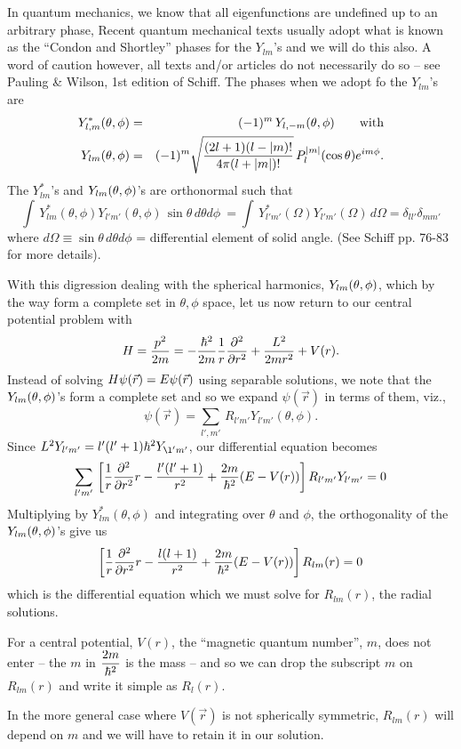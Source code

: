 In quantum mechanics, we know that all eigenfunctions are undefined up to an arbitrary phase, Recent quantum mechanical texts usually adopt what is known as the ``Condon and Shortley'' phases for the $Y_{lm}$'s and we will 
do this also. A word of caution however, all texts and/or articles do not necessarily do so -- see Pauling \& Wilson, 1st edition of Schiff. The phases when we adopt fo the $Y_{lm}$'s are
\begin{eqnarray*}
Y^*_{l,m}(\theta,\phi) &=& (-1)^m\, Y_{l,-m}(\theta,\phi) \mbox{ ~~~~ with} \\
Y_{lm}(\theta,\phi) &=& (-1)^m \sqrt{(2l+1)(l-|m)! \over 4\pi(l+|m|)!}  \, P_l^{|m|}(\cos\theta)e^{im\phi}.
\end{eqnarray*}
The $Y^*_{lm}$'s and $Y_{lm}(\theta,\phi)$'s are orthonormal such that 
\[ \int\, Y^*_{lm}(\theta,\phi) Y_{l'm'}(\theta,\phi)\, \sin\theta\, d\theta d\phi  \ = \int \, Y^*_{l'm'}(\Omega)Y_{l'm'}(\Omega)\, d\Omega = \delta_{ll'} \delta_{mm'} \]
where $d\Omega \equiv \sin\theta \, d\theta d\phi $ = differential element of solid angle. (See Schiff pp. 76-83 for more details).

With this digression dealing with the spherical harmonics, $Y_{lm}(\theta,\phi)$, which by the way form a complete set in $\theta, \phi$ space, let us now return to our central potential problem with 
\[ H = {p^2\over2m} = -{\hbar^2\over2m} {1\over r} {\partial^2 \over \partial r^2} + {L^2\over2mr^2} + V(r). \]
Instead of solving $\displaystyle H \psi(\vec{r}) = E\psi(\vec{r})$ using separable solutions, we note that the $Y_{lm}(\theta,\phi)$'s form a complete set and so we expand $\psi(\vec{r})$ in terms of them, viz.,
\[ \psi(\vec{r}) = \sum_{l',m'} \, R_{l'm'} Y_{l'm'}(\theta, \phi). \]
Since $L^2 Y_{l'm'} = l'(l'+1)\hbar^2 Y_{\l'm'}$, our differential 
equation becomes
\[ \sum_{l'm'}\, \left[ {1\over r} {\partial^2\over \partial r^2} r - {l'(l'+1)\over r^2} + {2m\over\hbar^2}(E - V(r))\right] R_{l'm'}Y_{l'm'} = 0 \]
Multiplying by $Y^*_{lm}(\theta,\phi)$ and integrating over $\theta$ and $\phi$, the orthogonality of the $Y_{lm}(\theta,\phi)$'s give us
\[ \left[ {1\over r} {\partial^2\over \partial r^2} r  -{l(l+1)\over r^2} + {2m\over\hbar^2}(E - V(r))\right] R_{lm}(r) = 0 \] which is the differential equation which we must solve for $R_{lm}(r)$, the radial solutions. 

For a central potential, $V(r)$, the ``magnetic quantum number'', $m$, does not enter -- the $m$ in $\displaystyle {2m\over\hbar^2}$ is the mass -- and so we can drop the subscript $m$ on $R_{lm}(r)$ and write it simple as $R_l(r)$.

In the more general case where $V(\vec{r})$ is not spherically symmetric, $R_{lm}(r)$ will depend on $m$ and we will have to retain it in our solution.

